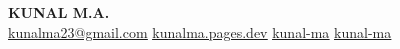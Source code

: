 \begin{center}
    \textbf{\Huge \scshape KUNAL M.A.} \\ \vspace{10pt}
    \small
    \href{mailto:kunalma23@gmail.com}{ \underline{kunalma23@gmail.com}} \quad
    \href{https://kunalma.pages.dev}{ \underline{kunalma.pages.dev}} \quad
    \href{https://www.linkedin.com/in/kunal-ma}{ \underline{kunal-ma}} \quad
    \href{https://github.com/kunal-ma}{ \underline{kunal-ma}} \\ \vspace{3pt}
\end{center}
